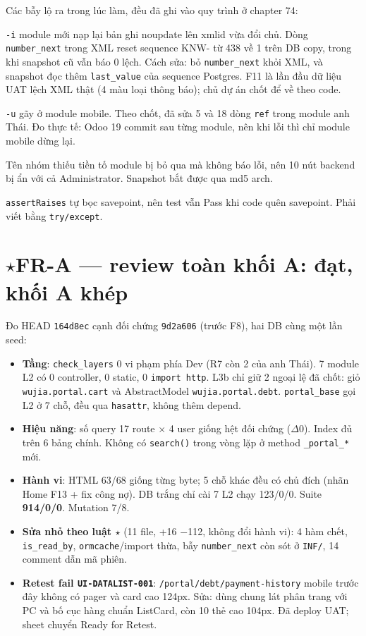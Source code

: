 Các bẫy lộ ra trong lúc làm, đều đã ghi vào quy trình ở chapter 74:
\begin{description}[nosep]
\item[Data \texttt{noupdate} (F9).] \texttt{-i} module mới nạp lại bản ghi noupdate lên xmlid vừa đổi chủ. Dòng
  \texttt{number\_next} trong XML reset sequence KNW- từ 438 về 1 trên DB copy, trong khi snapshot cũ vẫn báo 0 lệch.
  Cách sửa: bỏ \texttt{number\_next} khỏi XML, và snapshot đọc thêm \texttt{last\_value} của sequence Postgres.
  F11 là lần đầu dữ liệu UAT lệch XML thật (4 màu loại thông báo); chủ dự án chốt để về theo code.
\item[Mobile tham chiếu xmlid portal (F8, F12).] \texttt{-u} gãy ở module mobile. Theo chốt, đã sửa 5 và 18 dòng
  \texttt{ref} trong module anh Thái. Đo thực tế: Odoo 19 commit sau từng module, nên khi lỗi thì chỉ module mobile dừng lại.
\item[\texttt{groups=} trong arch view (F12).] Tên nhóm thiếu tiền tố module bị bỏ qua mà không báo lỗi, nên 10 nút
  backend bị ẩn với cả Administrator. Snapshot bắt được qua md5 arch.
\item[Test rollback (F8).] \texttt{assertRaises} tự bọc savepoint, nên test vẫn Pass khi code quên savepoint.
  Phải viết bằng \texttt{try/except}.
\end{description}

\section{$\star$FR-A --- review toàn khối A: đạt, khối A khép}

Đo HEAD \texttt{164d8ec} cạnh đối chứng \texttt{9d2a606} (trước F8), hai DB cùng một lần seed:
\begin{itemize}[nosep]
\item \textbf{Tầng}: \texttt{check\_layers} 0 vi phạm phía Dev (R7 còn 2 của anh Thái). 7 module L2 có 0 controller,
  0 static, 0 \texttt{import http}. L3b chỉ giữ 2 ngoại lệ đã chốt: giỏ \texttt{wujia.portal.cart} và AbstractModel
  \texttt{wujia.portal.debt}. \texttt{portal\_base} gọi L2 ở 7 chỗ, đều qua \texttt{hasattr}, không thêm depend.
\item \textbf{Hiệu năng}: số query 17 route $\times$ 4 user giống hệt đối chứng ($\Delta$0). Index đủ trên 6 bảng chính.
  Không có \texttt{search()} trong vòng lặp ở method \texttt{\_portal\_*} mới.
\item \textbf{Hành vi}: HTML 63/68 giống từng byte; 5 chỗ khác đều có chủ đích (nhãn Home F13 + fix công nợ).
  DB trắng chỉ cài 7 L2 chạy 123/0/0. Suite \textbf{914/0/0}. Mutation 7/8.
\item \textbf{Sửa nhỏ theo luật $\star$} (11 file, +16 $-$112, không đổi hành vi): 4 hàm chết, \texttt{is\_read\_by},
  \texttt{ormcache}/import thừa, bẫy \texttt{number\_next} còn sót ở \texttt{INF/}, 14 comment dẫn mã phiên.
\item \textbf{Retest fail \texttt{UI-DATALIST-001}}: \texttt{/portal/debt/payment-history} mobile trước đây không có
  pager và card cao 124px. Sửa: dùng chung lát phân trang với PC và bố cục hàng chuẩn ListCard, còn 10 thẻ cao 104px.
  Đã deploy UAT; sheet chuyển Ready for Retest.
\end{itemize}

